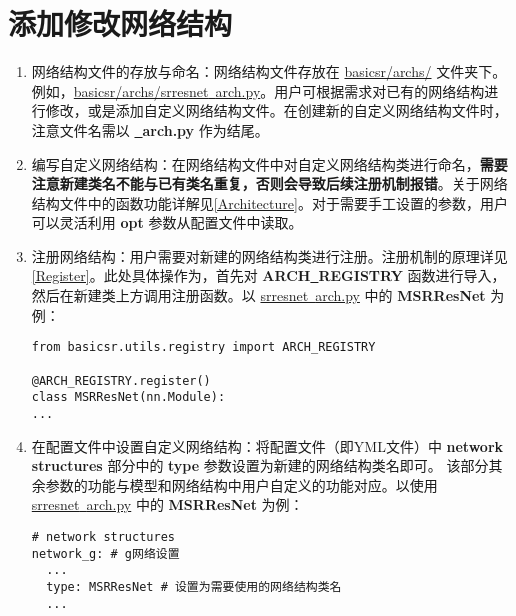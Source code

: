 \documentclass[../main.tex]{subfiles}
\begin{document}
\section{添加修改网络结构}

\begin{enumerate}
	\item 网络结构文件的存放与命名：网络结构文件存放在 \href{https://github.com/XPixelGroup/BasicSR/tree/master/basicsr/archs}{basicsr/archs/} 文件夹下。例如，\href{https://github.com/XPixelGroup/BasicSR/tree/master/basicsr/archs}{basicsr/archs/srresnet\underline{~}arch.py}。用户可根据需求对已有的网络结构进行修改，或是添加自定义网络结构文件。在创建新的自定义网络结构文件时，注意文件名需以  \textbf{\underline{~}arch.py} 作为结尾。
	
	\item 编写自定义网络结构：在网络结构文件中对自定义网络结构类进行命名，\textbf{需要注意新建类名不能与已有类名重复，否则会导致后续注册机制报错}。关于网络结构文件中的函数功能详解见\ref{Architecture}。对于需要手工设置的参数，用户可以灵活利用 \textbf{opt} 参数从配置文件中读取。
	
	\item 注册网络结构：用户需要对新建的网络结构类进行注册。注册机制的原理详见\ref{Register}。此处具体操作为，首先对 \textbf{ARCH\underline{~}REGISTRY} 函数进行导入，然后在新建类上方调用注册函数。以 \href{https://github.com/XPixelGroup/BasicSR/tree/master/basicsr/archs/srresnet_arch.py}{srresnet\underline{~}arch.py} 中的 \textbf{MSRResNet} 为例：
\begin{verbatim}
from basicsr.utils.registry import ARCH_REGISTRY

@ARCH_REGISTRY.register()
class MSRResNet(nn.Module):
...
\end{verbatim}
	
	\item 在配置文件中设置自定义网络结构：将配置文件（即YML文件）中 \textbf{network structures} 部分中的 \textbf{type} 参数设置为新建的网络结构类名即可。
	该部分其余参数的功能与模型和网络结构中用户自定义的功能对应。以使用 \href{https://github.com/XPixelGroup/BasicSR/tree/master/basicsr/archs/srresnet_arch.py}{srresnet\underline{~}arch.py} 中的 \textbf{MSRResNet} 为例：
\begin{verbatim}
# network structures
network_g: # g网络设置
  ...
  type: MSRResNet # 设置为需要使用的网络结构类名
  ...
\end{verbatim}
\end{enumerate}
\end{document}
